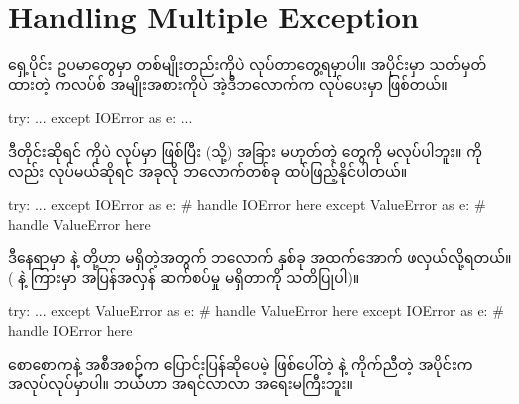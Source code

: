 \section{Handling Multiple Exception}
ရှေ့ပိုင်း  ဥပမာတွေမှာ  တစ်မျိုးတည်းကိုပဲ  လုပ်တာတွေ့ရမှာပါ။  အပိုင်းမှာ သတ်မှတ်ထားတဲ့  ကလပ်စ် အမျိုးအစားကိုပဲ အဲ့ဒီဘလောက်က  လုပ်ပေးမှာ ဖြစ်တယ်။  
%
\begin{py}
try:
    ...
except IOError as e:
    ...
\end{py}
% 
ဒီတိုင်းဆိုရင်  ကိုပဲ  လုပ်မှာ ဖြစ်ပြီး  (သို့) အခြား   မဟုတ်တဲ့  တွေကို  မလုပ်ပါဘူး။  ကိုလည်း  လုပ်မယ်ဆိုရင် အခုလို  ဘလောက်တစ်ခု ထပ်ဖြည့်နိုင်ပါတယ်။
%
\begin{py}
try:
    ...
except IOError as e:
    # handle IOError here
except ValueError as e:
    # handle ValueError here
\end{py}
% 
ဒီနေရာမှာ  နဲ့  တို့ဟာ  မရှိတဲ့အတွက်  ဘလောက် နှစ်ခု အထက်အောက် ဖလှယ်လို့ရတယ်။ ( နဲ့  ကြားမှာ  အပြန်အလှန် ဆက်စပ်မှု မရှိတာကို သတိပြုပါ)။
%
\begin{py}
try:
    ...
except ValueError as e:
    # handle ValueError here
except IOError as e:
    # handle IOError here
\end{py}
% 
စောစောကနဲ့ အစီအစဉ်က ပြောင်းပြန်ဆိုပေမဲ့ ဖြစ်ပေါ်တဲ့  နဲ့ ကိုက်ညီတဲ့  အပိုင်းက အလုပ်လုပ်မှာပါ။ ဘယ်ဟာ အရင်လာလာ အရေးမကြီးဘူး။ 


